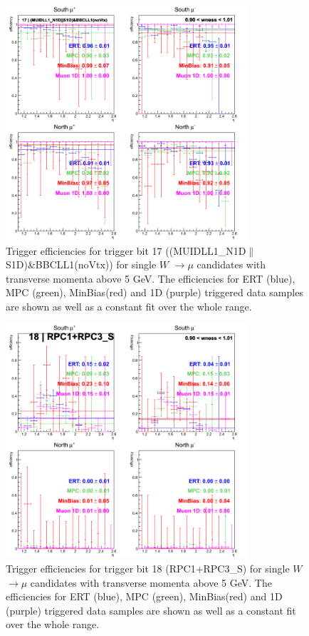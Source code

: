 \begin{figure}[h!]

  \centering

  \includegraphics[width=0.8\textwidth]{./figures/run13_trigeffieta_w1_trig17_lin.png}
  \caption{\label{fig:run13_trigeffieta_w0_nper0_trig17_lin} Trigger efficiencies for trigger bit 17 ((MUIDLL1\_N1D$\|$S1D)\&BBCLL1(noVtx)) for single $W$ $\rightarrow \mu$ candidates with transverse momenta above 5 GeV. The efficiencies for ERT (blue), MPC (green), MinBias(red) and 1D (purple) triggered data samples are shown as well as a constant fit over the whole range.}

\end{figure}
\clearpage
\begin{figure}[h!]

  \centering

  \includegraphics[width=0.8\textwidth]{./figures/run13_trigeffieta_w1_trig18_lin.png}
  \caption{\label{fig:run13_trigeffieta_w0_nper0_trig18_lin} Trigger efficiencies for trigger bit 18 (RPC1+RPC3\_S) for single $W$ $\rightarrow \mu$ candidates with transverse momenta above 5 GeV. The efficiencies for ERT (blue), MPC (green), MinBias(red) and 1D (purple) triggered data samples are shown as well as a constant fit over the whole range.}

\end{figure}
